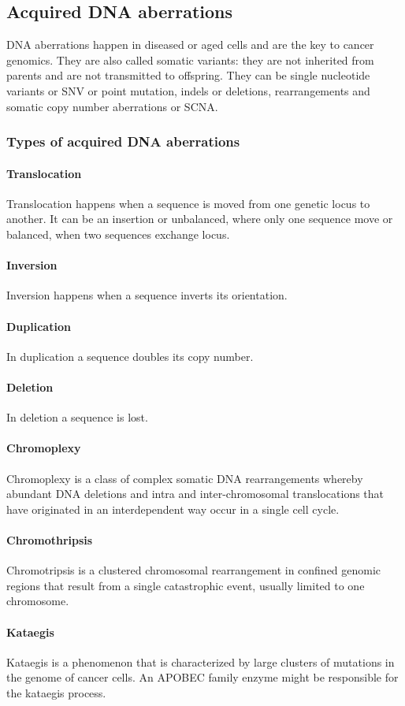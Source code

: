 	\subsection{Acquired DNA aberrations}
	DNA aberrations happen in diseased or aged cells and are the key to cancer genomics.
	They are also called somatic variants: they are not inherited from parents and are not transmitted to offspring.
	They can be single nucleotide variants or SNV or point mutation, indels or deletions, rearrangements and somatic copy number aberrations or SCNA.

		\subsubsection{Types of acquired DNA aberrations}

			\paragraph{Translocation}
			Translocation happens when a sequence is moved from one genetic locus to another.
			It can be an insertion or unbalanced, where only one sequence move or balanced, when two sequences exchange locus.

			\paragraph{Inversion}
			Inversion happens when a sequence inverts its orientation.

			\paragraph{Duplication}
			In duplication a sequence doubles its copy number.

			\paragraph{Deletion}
			In deletion a sequence is lost.

			\paragraph{Chromoplexy}
			Chromoplexy is a class of complex somatic DNA rearrangements whereby abundant DNA deletions and intra and inter-chromosomal translocations that have originated in an interdependent way occur in a single cell cycle.

			\paragraph{Chromothripsis}
			Chromotripsis is a clustered chromosomal rearrangement in confined genomic regions that result from a single catastrophic event, usually limited to one chromosome.

			\paragraph{Kataegis}
			Kataegis is a phenomenon that is characterized by large clusters of mutations in the genome of cancer cells.
			An APOBEC family enzyme might be responsible for the kataegis process.
